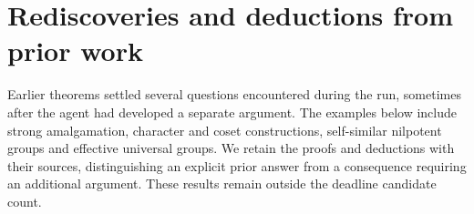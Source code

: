 \section{Rediscoveries and deductions from prior work}
\label{app:prior}

Earlier theorems settled several questions encountered during the run,
sometimes after the agent had developed a separate argument. The examples
below include strong amalgamation, character and coset constructions,
self-similar nilpotent groups and effective universal groups. We retain
the proofs and deductions with their sources, distinguishing an explicit
prior answer from a consequence requiring an additional argument.
These results remain outside the deadline candidate count.




